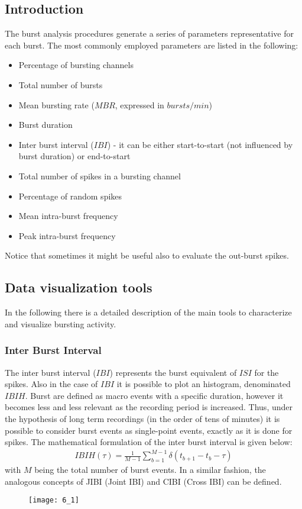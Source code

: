 \subsection{Introduction}
The burst analysis procedures generate a series of parameters representative for
each burst. The most commonly employed parameters are listed in the following:
\begin{itemize}
    \item Percentage of bursting channels
    \item Total number of bursts
    \item Mean bursting rate (\(MBR\), expressed in \(bursts/min\))
    \item Burst duration
    \item Inter burst interval (\(IBI\)) - it can be either start-to-start (not
    influenced by burst duration) or end-to-start
    \item Total number of spikes in a bursting channel
    \item Percentage of random spikes
    \item Mean intra-burst frequency
    \item Peak intra-burst frequency
\end{itemize}
Notice that sometimes it might be useful also to evaluate the out-burst spikes.

\subsection{Data visualization tools}
In the following there is a detailed description of the main tools to characterize and
visualize bursting activity.

\subsubsection{Inter Burst Interval}
The inter burst interval (\(IBI\)) represents the burst equivalent of \(ISI\) for
the spikes. Also in the case of \(IBI\) it is possible to plot an histogram,
denominated \(IBIH\). Burst are defined as macro events with a specific duration,
however it becomes less and less relevant as the recording period is increased.
Thus, under the hypothesis of long term recordings (in the order of tens of minutes)
it is possible to consider burst events as single-point events, exactly as it is done
for spikes. The mathematical formulation of the inter burst interval is given below:
\begin{align*}
    IBIH(\tau)=\frac{1}{M-1}\sum_{b=1}^{M-1}\delta(t_{b+1}-t_{b}-\tau)
\end{align*}
with \(M\) being the total number of burst events.
In a similar fashion, the analogous concepts of JIBI (Joint IBI) and CIBI (Cross IBI)
can be defined.
\begin{figure}[H]
    \texttt{[image: 6\_1]}
    \centering
\end{figure}

